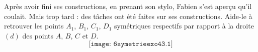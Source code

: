 Après avoir fini ses constructions, en prenant son stylo, Fabien s'est
aperçu qu'il coulait. Mais trop tard : des tâches ont été faites sur
ses constructions. Aide-le à retrouver les points $A_1$, $B_1$, $C_1$,
$D_1$ symétriques respectifs par rapport à la droite $(d)$ des points
$A$, $B$, $C$ et $D$.
\[\texttt{[image: 6symetrieexo43.1]}\]